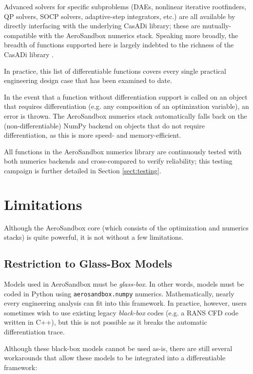 \begin{example}
    \noindent
    Advanced solvers for specific subproblems (DAEs, nonlinear iterative rootfinders, QP solvers, SOCP solvers, adaptive-step integrators, etc.) are all available by directly interfacing with the underlying CasADi library; these are mutually-compatible with the AeroSandbox numerics stack. Speaking more broadly, the breadth of functions supported here is largely indebted to the richness of the CasADi library \cite{casadi}.
\end{example}

In practice, this list of differentiable functions covers every single practical engineering design case that has been examined to date.

In the event that a function without differentiation support is called on an object that requires differentiation (e.g. any composition of an optimization variable), an error is thrown. The AeroSandbox numerics stack automatically falls back on the (non-differentiable) NumPy backend on objects that do not require differentiation, as this is more speed- and memory-efficient.

All functions in the AeroSandbox numerics library are continuously tested with both numerics backends and cross-compared to verify reliability; this testing campaign is further detailed in Section \ref{sect:testing}.


\section{Limitations}

Although the AeroSandbox core (which consists of the optimization and numerics stacks) is quite powerful, it is not without a few limitations.

\subsection{Restriction to Glass-Box Models}
\label{sect:glass-box}

Models used in AeroSandbox must be \textit{glass-box}. In other words, models must be coded in Python using \texttt{aerosandbox.numpy} numerics. Mathematically, nearly every engineering analysis can fit into this framework. In practice, however, users sometimes wish to use existing legacy \textit{black-box} codes (e.g. a RANS CFD code written in C++), but this is not possible as it breaks the automatic differentiation trace.

Although these black-box models cannot be used as-is, there are still several workarounds that allow these models to be integrated into a differentiable framework:

